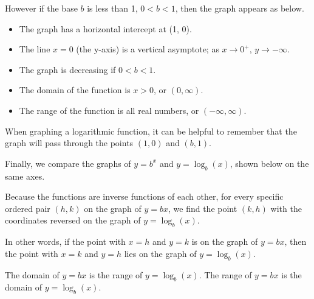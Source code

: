 However if the base $b$ is less than 1, $0 < b < 1$, then the graph appears as below.

\begin{center}
\end{center}

\begin{itemize}
    \item The graph has a horizontal intercept at (1, 0).
    \item The line $x = 0$ (the y-axis) is a vertical asymptote; as $x \rightarrow 0^+$, $y \rightarrow -\infty$.
    \item The graph is decreasing if $0 < b < 1$.
    \item The domain of the function is $x > 0$, or $(0, \infty)$.
    \item The range of the function is all real numbers, or $(-\infty, \infty)$.
\end{itemize}

When graphing a logarithmic function, it can be helpful to remember that the graph will pass through the points $(1, 0)$ and $(b, 1)$.

Finally, we compare the graphs of \( y = b^x \) and \( y = \log_b(x) \), shown below on the same axes.

Because the functions are inverse functions of each other, for every specific ordered pair $(h, k)$ on the graph of $y = bx$, we find the point $(k, h)$ with the coordinates reversed on the graph of $y = \log_b (x)$.

In other words, if the point with $x = h$ and $y = k$ is on the graph of $y = bx$, then the point with $x = k$ and $y = h$ lies on the graph of $y = \log_b (x)$.

The domain of $y = bx$ is the range of $y = \log_b (x)$. The range of $y = bx$ is the domain of $y = \log_b (x)$.

